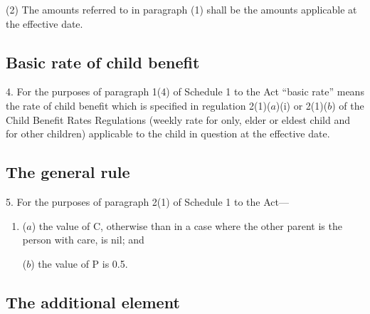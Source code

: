\documentclass[12pt,a4paper]{article}
\begin{document}
(2) The amounts referred to in paragraph (1) shall be the amounts applicable at the effective date.


\subsection[4. Basic rate of child benefit]{Basic rate of child benefit}

4.  For the purposes of paragraph 1(4) of Schedule 1 to the Act “basic rate” means the rate of child benefit which is specified in 
regulation 2(1)($a$)(i) or 2(1)($b$) of the Child Benefit Rates Regulations (weekly rate for only, elder or eldest child and for other children)  %
applicable to the child in question at the effective date.


\subsection[5. The general rule]{The general rule}

5.  For the purposes of paragraph 2(1) of Schedule 1 to the Act—
\begin{enumerate}\item[]
($a$) the value of C, otherwise than in a case where the other parent is the person with care, is nil; and

($b$) the value of P is 0.5.
\end{enumerate}

\subsection[6. The additional element]{The additional element}
\end{document}
